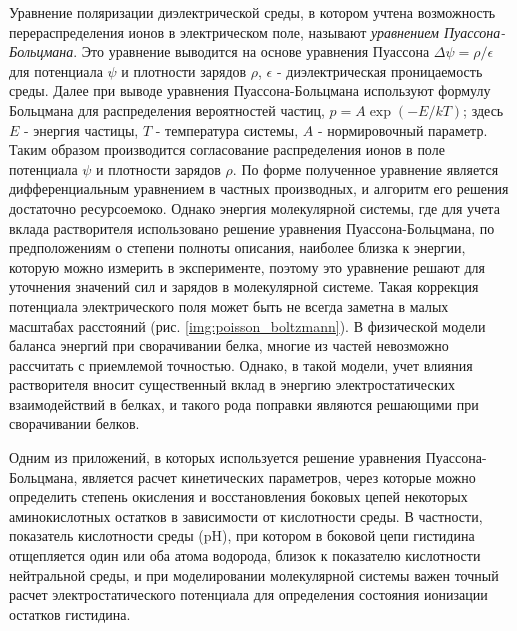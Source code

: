 Уравнение поляризации диэлектрической среды, в котором учтена возможность перераспределения ионов в электрическом поле, называют \textit{уравнением Пуассона-Больцмана}. Это уравнение выводится на основе уравнения Пуассона $\Delta\psi = \rho / \epsilon $ для потенциала $\psi$ и плотности зарядов $\rho$, $\epsilon$ - диэлектрическая проницаемость среды. Далее при выводе уравнения Пуассона-Больцмана используют формулу Больцмана для распределения вероятностей частиц, $p=A\exp(-E/kT)$; здесь $E$ - энергия частицы, $T$ - температура системы, $A$ - нормировочный параметр. Таким образом производится согласование распределения ионов в поле потенциала $\psi$ и плотности зарядов $\rho$. По форме полученное уравнение является дифференциальным уравнением в частных производных, и алгоритм его решения достаточно ресурсоемоко. Однако энергия молекулярной системы, где для учета вклада растворителя использовано решение уравнения Пуассона-Больцмана, по предположениям о степени полноты описания, наиболее близка к энергии, которую можно измерить в эксперименте, поэтому это уравнение решают для уточнения значений сил и зарядов в молекулярной системе. Такая коррекция потенциала электрического поля может быть не всегда заметна в малых масштабах расстояний (рис. \ref{img:poisson_boltzmann}). В физической модели баланса энергий при сворачивании белка, многие из частей невозможно рассчитать с приемлемой точностью. Однако, в такой модели, учет влияния растворителя вносит существенный вклад в энергию электростатических взаимодействий в белках, и такого рода поправки являются решающими при сворачивании белков.

Одним из приложений, в которых используется решение уравнения Пуассона-Больцмана, является расчет кинетических параметров, через которые можно определить степень окисления и восстановления боковых цепей некоторых аминокислотных остатков в зависимости от кислотности среды. В частности, показатель кислотности среды (pH), при котором в боковой цепи гистидина отщепляется один или оба атома водорода, близок к показателю кислотности нейтральной среды, и при моделировании молекулярной системы важен точный расчет электростатического потенциала для определения состояния ионизации остатков гистидина.

